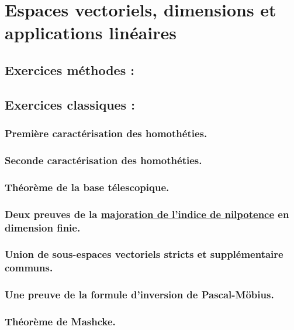 \section{Espaces vectoriels, dimensions et applications linéaires}
\subsection{Exercices méthodes :}
\subsection{Exercices classiques :}
\subsubsection{Première caractérisation des homothéties.}
\subsubsection{Seconde caractérisation des homothéties.}
\subsubsection{Théorème de la base télescopique.}
\subsubsection{Deux preuves de la \underline{majoration de l'indice de nilpotence} en dimension finie.}
\subsubsection{Union de sous-espaces vectoriels stricts et supplémentaire communs.}
\subsubsection{Une preuve de la formule d'inversion de Pascal-Möbius.}
\subsubsection{Théorème de Mashcke.}
